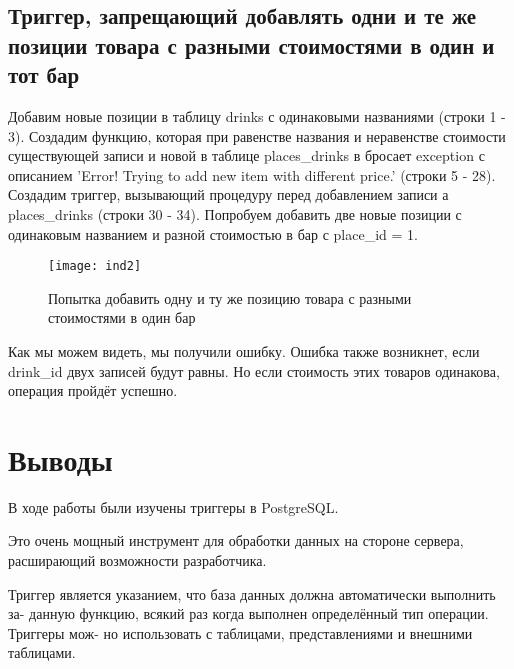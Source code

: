 \subsection{Триггер, запрещающий добавлять одни и те же позиции товара с разными стоимостями в один и тот бар}



Добавим новые позиции в таблицу drinks с одинаковыми названиями (строки 1 - 3).
Создадим функцию, которая при равенстве названия и неравенстве стоимости существующей записи и новой в таблице places\_drinks в бросает exception с описанием 'Error! Trying to add new item with different price.' (строки 5 - 28). Создадим триггер, вызывающий процедуру перед добавлением записи а places\_drinks (строки 30 - 34). Попробуем добавить две новые позиции с одинаковым названием и разной стоимостью в бар с place\_id = 1.

\begin{figure}[H]
	\begin{center}
		\texttt{[image: ind2]}
		\caption{Попытка добавить одну и ту же позицию товара с разными стоимостями в один бар} 
		\label{pic:ind2} %
	\end{center}
\end{figure}

Как мы можем видеть, мы получили ошибку. Ошибка также возникнет, если drink\_id двух записей будут равны.
Но если стоимость этих товаров одинакова, операция пройдёт успешно.

\newpage
\section{Выводы}
В ходе работы были изучены триггеры в PostgreSQL. 

Это очень мощный инструмент
для обработки данных на стороне сервера, расширающий возможности разработчика.

Триггер является указанием, что база данных должна автоматически выполнить за-
данную функцию, всякий раз когда выполнен определённый тип операции. Триггеры мож-
но использовать с таблицами, представлениями и внешними таблицами.

